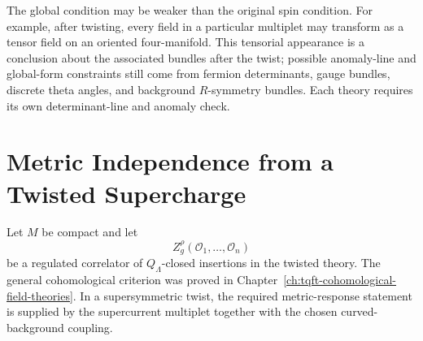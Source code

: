 The global condition may be weaker than the original spin condition.  For
example, after twisting, every field in a particular multiplet may transform
as a tensor field on an oriented four-manifold.  This tensorial appearance is
a conclusion about the associated bundles after the twist; possible
anomaly-line and global-form constraints still come from fermion
determinants, gauge bundles, discrete theta angles, and background
\(R\)-symmetry bundles.  Each theory requires its own determinant-line and
anomaly check.

\section{Metric Independence from a Twisted Supercharge}

Let \(M\) be compact and let
\[
  Z_g^\rho(\mathcal O_1,\ldots,\mathcal O_n)
\]
be a regulated correlator of \(Q_\Lambda\)-closed insertions in the twisted
theory.  The general cohomological criterion was proved in
Chapter~\ref{ch:tqft-cohomological-field-theories}.  In a supersymmetric
twist, the required metric-response statement is supplied by the
supercurrent multiplet together with the chosen curved-background coupling.

